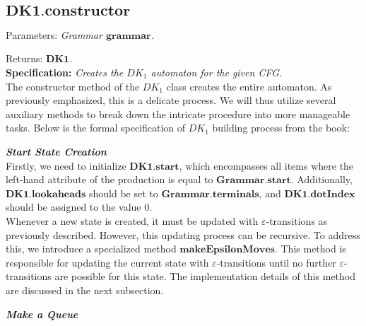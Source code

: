 \vspace{10pt}

\subsection*{\(\boldsymbol{DK1.constructor}\)}

Parameters: \textit{Grammar \(\boldsymbol{grammar}\).}

Returns: \textit{\(\boldsymbol{DK1}\).}\\

\textbf{Specification:} \textit{Creates the \(DK_{1}\) automaton for the given CFG.}\\

The constructor method of the \(DK_{1}\) class creates the entire automaton. As previously emphasized, this is a delicate process. We will thus utilize several auxiliary methods to break down the intricate procedure into more manageable tasks. Below is the formal specification of \(DK_{1}\) building process from the book:\\


\vspace{15pt}

\textbf{\textit{Start State Creation}}\\

Firstly, we need to initialize \(\boldsymbol{DK1.start}\), which encompasses all items where the left-hand attribute of the production is equal to \(\boldsymbol{Grammar.start}\). Additionally, \(\boldsymbol{DK1.lookaheads}\) should be set to \(\boldsymbol{Grammar.terminals}\), and \(\boldsymbol{DK1.dotIndex}\) should be assigned to the value 0.\\

Whenever a new state is created, it must be updated with \(\varepsilon\)-transitions as previously described. However, this updating process can be recursive. To address this, we introduce a specialized method \(\boldsymbol{makeEpsilonMoves}\). This method is responsible for updating the current state with \(\varepsilon\)-transitions until no further \(\varepsilon\)-transitions are possible for this state. The implementation details of this method are discussed in the next subsection.\\

\vspace{15pt}

\textbf{\textit{Make a Queue}}\\

